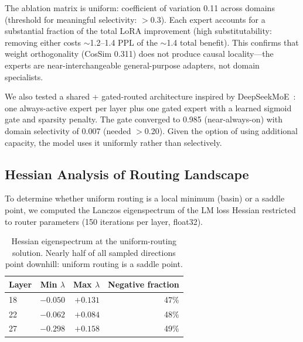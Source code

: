 \documentclass{article}
\begin{document}
The ablation matrix is uniform: coefficient of variation 0.11 across domains
(threshold for meaningful selectivity: $>$0.3). Each expert accounts for a substantial fraction of the total LoRA improvement
(high substitutability: removing either costs $\sim$1.2--1.4 PPL of the
$\sim$1.4 total benefit). This confirms that
weight orthogonality (CosSim 0.311) does not produce causal locality---the
experts are near-interchangeable general-purpose adapters, not domain
specialists.

We also tested a shared + gated-routed architecture inspired by
DeepSeekMoE~\cite{deepseek2024moe}: one always-active expert per layer plus
one gated expert with a learned sigmoid gate and sparsity penalty. The gate
converged to 0.985 (near-always-on) with domain selectivity of 0.007 (needed
$>$0.20). Given the option of using additional capacity, the model uses it
uniformly rather than selectively.

\subsection{Hessian Analysis of Routing Landscape}
\label{sec:hessian}

To determine whether uniform routing is a local minimum (basin) or a saddle
point, we computed the Lanczos eigenspectrum of the LM loss Hessian restricted
to router parameters (150 iterations per layer, float32).

\begin{table}[h]
\centering
\caption{Hessian eigenspectrum at the uniform-routing solution. Nearly half of
all sampled directions point downhill: uniform routing is a saddle point.}
\label{tab:hessian}
\begin{tabular}{@{}lrrr@{}}
\toprule
Layer & Min $\lambda$ & Max $\lambda$ & Negative fraction \\
\midrule
18 & $-0.050$ & $+0.131$ & 47\% \\
22 & $-0.062$ & $+0.084$ & 48\% \\
27 & $-0.298$ & $+0.158$ & 49\% \\
\bottomrule
\end{tabular}
\end{table}
\end{document}
